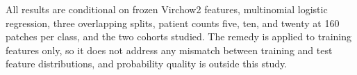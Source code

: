 \documentclass[11pt]{article}
\begin{document}
All results are conditional on frozen Virchow2 features, multinomial logistic regression, three overlapping splits, patient counts five, ten, and twenty at 160 patches per class, and the two cohorts studied. The remedy is applied to training features only, so it does not address any mismatch between training and test feature distributions, and probability quality is outside this study.



\end{document}
